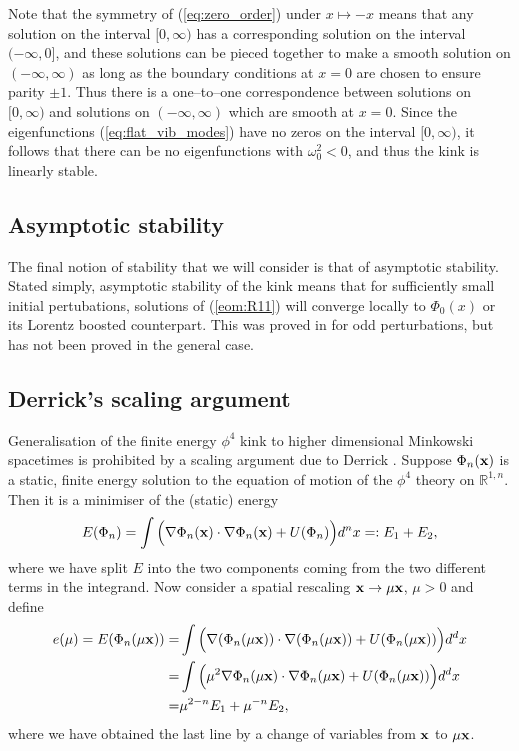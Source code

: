 Note that the symmetry of (\ref{eq:zero_order}) under $x\mapsto -x$ means that any solution on the interval $[0,\infty)$ has a corresponding solution on the interval $(-\infty,0]$, and these solutions can be pieced together to make a smooth solution on $(-\infty,\infty)$ as long as the boundary conditions at $x=0$ are chosen to ensure parity $\pm1$. Thus there is a one--to--one correspondence between solutions on $[0,\infty)$ and solutions on $(-\infty,\infty)$ which are smooth at $x=0$.
Since the eigenfunctions (\ref{eq:flat_vib_modes}) have no zeros on the interval $[0,\infty)$, it follows that there can be no eigenfunctions with $\omega_0^2<0$, and thus the kink is linearly stable.

\subsection{Asymptotic stability}
The final notion of stability that we will consider is that of asymptotic stability. Stated simply, asymptotic stability of the kink means that for sufficiently small initial pertubations, solutions of (\ref{eom:R11}) will converge locally to $\Phi_0(x)$ or its Lorentz boosted counterpart. This was proved in \cite{KowalczykMM} for odd perturbations, but has not been proved in the general case.

\subsection{Derrick's scaling argument}
Generalisation of the finite energy $\phi^4$ kink to higher dimensional Minkowski spacetimes is prohibited by a scaling argument due to Derrick \cite{Derrick}. Suppose $\Phi_n({\bf x})$ is a static, finite energy solution to the equation of motion of the $\phi^4$ theory on $\mathbb{R}^{1,n}$. Then it is a minimiser of the (static) energy
\[
E(\Phi_n)=\int\Big(\nabla\Phi_n({\bf x})\cdot\nabla\Phi_n({\bf x}) + U(\Phi_n)\Big)d^nx=:E_1+E_2,
\]
where we have split $E$ into the two components coming from the two different terms in the integrand. Now consider a spatial rescaling ${\bf x}\rightarrow\mu{\bf x}$, $\mu>0$ and define 
\begin{align*}
e(\mu)= E(\Phi_n(\mu{\bf x}))=&\int\Big(\nabla(\Phi_n(\mu {\bf x}))\cdot\nabla(\Phi_n(\mu {\bf x})) + U(\Phi_n(\mu {\bf x}))\Big)d^dx \\
=& \int\Big(\mu^2\nabla\Phi_n(\mu {\bf x})\cdot\nabla\Phi_n(\mu {\bf x}) + U(\Phi_n(\mu {\bf x}))\Big)d^dx \\
=& \mu^{2-n}E_1 + \mu^{-n}E_2,
\end{align*}
where we have obtained the last line by a change of variables from ${\bf x}$ to $\mu{\bf x}$.

